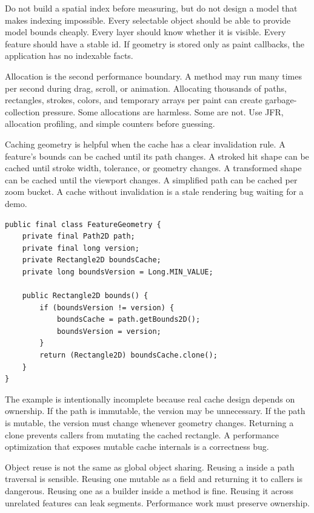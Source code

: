Do not build a spatial index before measuring, but do not design a model that makes indexing impossible. Every selectable object should be able to provide model bounds cheaply. Every layer should know whether it is visible. Every feature should have a stable id. If geometry is stored only as paint callbacks, the application has no indexable facts.

Allocation is the second performance boundary. A  method may run many times per second during drag, scroll, or animation. Allocating thousands of paths, rectangles, strokes, colors, and temporary arrays per paint can create garbage-collection pressure. Some allocations are harmless. Some are not. Use JFR, allocation profiling, and simple counters before guessing.

Caching geometry is helpful when the cache has a clear invalidation rule. A feature's bounds can be cached until its path changes. A stroked hit shape can be cached until stroke width, tolerance, or geometry changes. A transformed shape can be cached until the viewport changes. A simplified path can be cached per zoom bucket. A cache without invalidation is a stale rendering bug waiting for a demo.

\begin{lstlisting}[caption={Versioned cached bounds for immutable geometry.}]
public final class FeatureGeometry {
    private final Path2D path;
    private final long version;
    private Rectangle2D boundsCache;
    private long boundsVersion = Long.MIN_VALUE;

    public Rectangle2D bounds() {
        if (boundsVersion != version) {
            boundsCache = path.getBounds2D();
            boundsVersion = version;
        }
        return (Rectangle2D) boundsCache.clone();
    }
}
\end{lstlisting}

The example is intentionally incomplete because real cache design depends on ownership. If the path is immutable, the version may be unnecessary. If the path is mutable, the version must change whenever geometry changes. Returning a clone prevents callers from mutating the cached rectangle. A performance optimization that exposes mutable cache internals is a correctness bug.

Object reuse is not the same as global object sharing. Reusing a  inside a path traversal is sensible. Reusing one mutable  as a field and returning it to callers is dangerous. Reusing one  as a builder inside a method is fine. Reusing it across unrelated features can leak segments. Performance work must preserve ownership.


